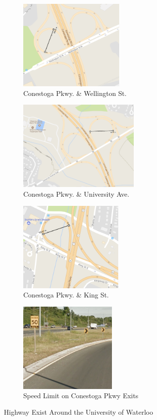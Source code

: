 \documentclass[12pt]{article}
\begin{document}
\begin{figure}[htbp]
	\centering
    \begin{subfigure}[b]{.4\textwidth}
		\caption{Conestoga Pkwy. \& Wellington St.}
		\centering
        \includegraphics[height=4.5cm]{./LaTex/hw1.PNG}
    \end{subfigure}
    \begin{subfigure}[b]{.4\textwidth}
		\caption{Conestoga Pkwy. \& University Ave.}
		\centering
        \includegraphics[height=4.5cm]{./LaTex/hw2.PNG}
    \end{subfigure}
    
    \bigskip
    \begin{subfigure}[b]{.4\textwidth}
		\caption{Conestoga Pkwy. \& King St.}
		\centering
        \includegraphics[height=4.5cm]{./LaTex/hw3.PNG}
    \end{subfigure}
    \begin{subfigure}[b]{.4\textwidth}
		\caption{Speed Limit on Conestoga Pkwy Exits}
		\centering
        \includegraphics[height=4.5cm]{./LaTex/speedLimit.PNG}
    \end{subfigure}
    \caption{Highway Exist Around the University of Waterloo}
	\label{fig:highwayExits}
\end{figure}
\end{document}
